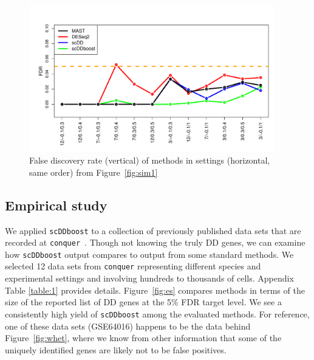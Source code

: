 \documentclass[aoas,preprint]{imsart}
\begin{document}
\begin{figure}[H]
  \includegraphics[width = 0.95\textwidth]{Figs/simuFDR.pdf}
  \caption{False discovery rate (vertical) of methods in settings (horizontal, same order) from Figure~\ref{fig:sim1} }
  \label{fig:sim2}
\end{figure}


\subsection{Empirical study}

We applied \verb+scDDboost+ to a collection of previously published
data sets that are recorded at \verb+conquer+~\citep{ref:Cq}.  
Though not knowing the truly DD
genes, we can examine how \verb+scDDboost+ output compares to output from some standard methods.  We selected
12 data sets from \verb+conquer+   representing different species and experimental settings
and involving hundreds to thousands of cells.   Appendix Table \ref{table:1} provides details.  Figure~\ref{fig:es} compares
methods in terms of the size of the reported list of DD genes at the 5\% FDR target level.  
We see a consistently high yield of \verb+scDDboost+ among the evaluated  methods.  For reference, one of these data 
sets (GSE64016) happens to be the data behind Figure~\ref{fig:whet}, where we know from other information that some
of the uniquely identified genes are likely not to be false positives.
\end{document}
